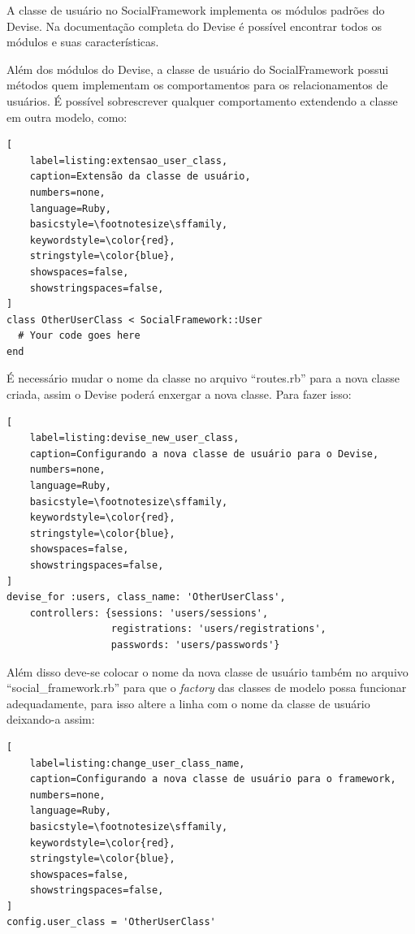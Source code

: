 A classe de usuário no SocialFramework implementa os módulos padrões do Devise. Na documentação completa do Devise é possível encontrar todos os módulos e suas características.

Além dos módulos do Devise, a classe de usuário do SocialFramework possui métodos quem implementam os comportamentos para os relacionamentos de usuários. É possível sobrescrever qualquer comportamento extendendo a classe em outra modelo, como:

\begin{lstlisting}[
    label=listing:extensao_user_class,
    caption=Extensão da classe de usuário,
    numbers=none,
    language=Ruby,
    basicstyle=\footnotesize\sffamily,
    keywordstyle=\color{red},
    stringstyle=\color{blue},
    showspaces=false,
    showstringspaces=false,
]
class OtherUserClass < SocialFramework::User
  # Your code goes here
end
\end{lstlisting}

É necessário mudar o nome da classe no arquivo ``routes.rb'' para a nova classe criada, assim o Devise poderá enxergar a nova classe. Para fazer isso:

\begin{lstlisting}[
    label=listing:devise_new_user_class,
    caption=Configurando a nova classe de usuário para o Devise,
    numbers=none,
    language=Ruby,
    basicstyle=\footnotesize\sffamily,
    keywordstyle=\color{red},
    stringstyle=\color{blue},
    showspaces=false,
    showstringspaces=false,
]
devise_for :users, class_name: 'OtherUserClass',
    controllers: {sessions: 'users/sessions',
                  registrations: 'users/registrations',
                  passwords: 'users/passwords'}
\end{lstlisting}

Além disso deve-se colocar o nome da nova classe de usuário também no arquivo ``social\_framework.rb'' para que o \textit{factory} das classes de modelo possa funcionar adequadamente, para isso altere a linha com o nome da classe de usuário deixando-a assim:

\begin{lstlisting}[
    label=listing:change_user_class_name,
    caption=Configurando a nova classe de usuário para o framework,
    numbers=none,
    language=Ruby,
    basicstyle=\footnotesize\sffamily,
    keywordstyle=\color{red},
    stringstyle=\color{blue},
    showspaces=false,
    showstringspaces=false,
]
config.user_class = 'OtherUserClass'
\end{lstlisting}

